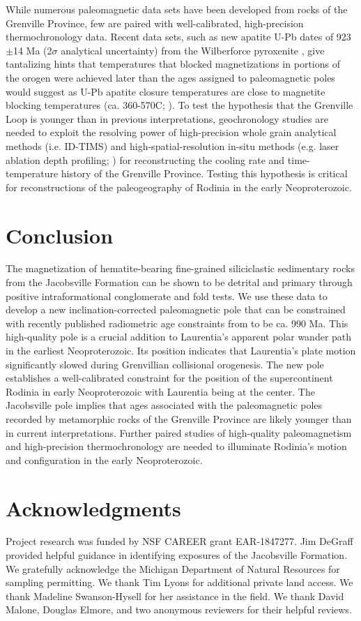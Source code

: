 While numerous paleomagnetic data sets have been developed from rocks of the Grenville Province, few are paired with well-calibrated, high-precision thermochronology data. Recent data sets, such as new apatite U-Pb dates of 923$\pm$14 Ma (2$\sigma$ analytical uncertainty) from the Wilberforce pyroxenite \citep{Paul2021a}, give tantalizing hints that temperatures that blocked magnetizations in portions of the orogen were achieved later than the ages assigned to paleomagnetic poles would suggest as U-Pb apatite closure temperatures are close to magnetite blocking temperatures (ca. 360-570\textdegree C; \cite{Cherniak1991a}). To test the hypothesis that the Grenville Loop is younger than in previous interpretations, geochronology studies are needed to exploit the resolving power of high-precision whole grain analytical methods (i.e. ID-TIMS) and high-spatial-resolution in-situ methods (e.g. laser ablation depth profiling; \cite{Chew2021a}) for reconstructing the cooling rate and time-temperature history of the Grenville Province. Testing this hypothesis is critical for reconstructions of the paleogeography of Rodinia in the early Neoproterozoic. 

\section*{Conclusion}

The magnetization of hematite-bearing fine-grained siliciclastic sedimentary rocks from the Jacobsville Formation can be shown to be detrital and primary through positive intraformational conglomerate and fold tests. We use these data to develop a new inclination-corrected paleomagnetic pole that can be constrained with recently published radiometric age constraints from \cite{Hodgin2022a} to be ca. 990 Ma. This high-quality pole is a crucial addition to Laurentia's apparent polar wander path in the earliest Neoproterozoic. Its position indicates that Laurentia's plate motion significantly slowed during Grenvillian collisional orogenesis. The new pole establishes a well-calibrated constraint for the position of the supercontinent Rodinia in early Neoproterozoic with Laurentia being at the center. The Jacobsville pole implies that ages associated with the paleomagnetic poles recorded by metamorphic rocks of the Grenville Province are likely younger than in current interpretations. Further paired studies of high-quality paleomagnetism and high-precision thermochronology are needed to illuminate Rodinia's motion and configuration in the early Neoproterozoic. 


\section*{Acknowledgments}
Project research was funded by NSF CAREER grant EAR-1847277. Jim DeGraff provided helpful guidance in identifying exposures of the Jacobsville Formation. We gratefully acknowledge the Michigan Department of Natural Resources for sampling permitting. We thank Tim Lyons for additional private land access. We thank Madeline Swanson-Hysell for her assistance in the field. We thank David Malone, Douglas Elmore, and two anonymous reviewers for their helpful reviews. 
